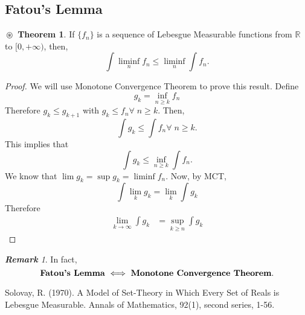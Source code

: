\documentclass{article}
\theoremstyle{definition}
\newtheorem{theorem}{$\boxed{\boxed{\circledast}}$ Theorem}
\theoremstyle{remark}
\newtheorem*{remark}{\textbf{Remark}}
\theoremstyle{definition}
\theoremstyle{definition}
\theoremstyle{definition}
\newcommand{\R}{\mathbb{R}}
\begin{document}
\newpage
\subsection{Fatou's Lemma}

\begin{theorem}
	If $ \{f_n\} $ is a sequence of Lebesgue Measurable functions from $ \R $ to $ [0,+\infty) $, then,
	\[\int \liminf_n f_n \le \liminf_n \int f_n.\]
\end{theorem}
\begin{proof}
	We will use Monotone Convergence Theorem to prove this result. Define
	\[g_k = \inf_{n\ge k} f_n\]
	Therefore $ g_k \le g_{k+1} $ with $ g_k \le f_n \forall\; n\ge k$. Then,
	\[\int g_k \le  \int f_n \forall\; n\ge k.\]
	This implies that 
	\[\int g_k \le \inf_{n\ge k} \int f_n.\]
	We know that $ \lim g_k = \sup g_k = \liminf f_n$. Now, by MCT, 
	\[\int \lim_k g_k = \lim_k \int g_k\]
	Therefore 
	\begin{equation*}
		\begin{split}
			\lim_{k\to \infty} \int g_k &= \sup_{k\ge n} \int g_k
		\end{split}
	\end{equation*}
\end{proof}
\begin{remark}
	In fact,
	\[\text{\textbf{Fatou's Lemma} $ \iff $ \textbf{Monotone Convergence Theorem}.}\]
\end{remark}






\newpage
\begin{thebibliography}{9}
	Solovay, R. (1970). A Model of Set-Theory in Which Every Set of Reals is Lebesgue Measurable. Annals of Mathematics, 92(1), second series, 1-56.
\end{thebibliography}
\end{document}
